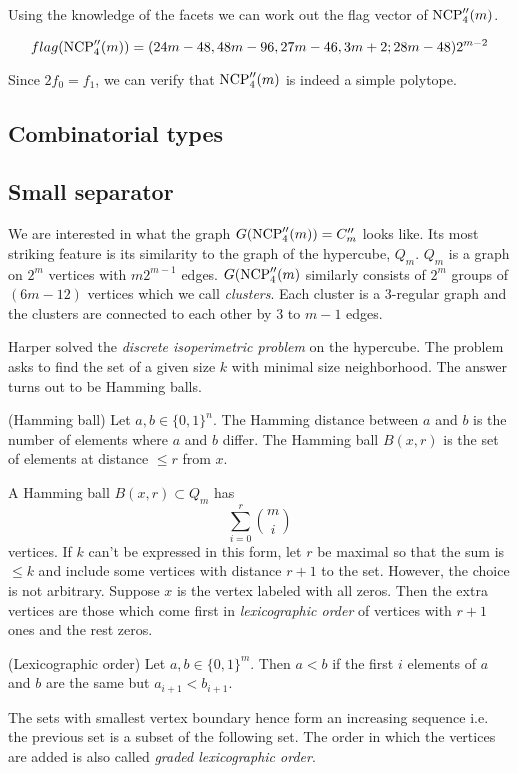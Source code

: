Using the knowledge of the facets we can work out the flag vector of 
$\textrm{NCP}''_4(m)$.

\begin{equation}
 flag(\textrm{NCP}''_4(m)) = (24m-48, 48m-96, 27m - 46, 3m+2; 28m -48)2^{m-2}
\end{equation}

Since $2f_0 = f_1$, we can verify that $\textrm{NCP}''_4(m)$ is indeed a simple 
polytope.

\subsection{Combinatorial types}

\subsection{Small separator}

We are interested in what the graph $G(\textrm{NCP}''_4(m)) = C''_m$ looks like. Its 
most striking feature is its similarity to the graph of the hypercube, $Q_m$. 
$Q_m$ is a graph on $2^m$ vertices with $m2^{m-1}$ edges. $G(\textrm{NCP}''_4(m)$ 
similarly consists of $2^m$ groups of $(6m-12)$ vertices which we call 
\textit{clusters}. Each cluster is a 3-regular graph and the clusters are 
connected to each other by 3 to $m-1$ edges. 

Harper solved the \textit{discrete isoperimetric problem} on the hypercube. The 
problem asks to find the set of a given size $k$ with minimal size 
neighborhood. The answer turns out to be Hamming balls.

\begin{definition}
 (Hamming ball) Let $a,b \in \{0,1\}^n$. The Hamming distance between $a$ and 
$b$ is the number of elements where $a$ and $b$ differ. The Hamming ball 
$B(x,r)$ is the set of elements at distance $\leq r$ from $x$.
\end{definition}

A Hamming ball $B(x,r) \subset Q_m$ has 
\begin{equation}
 \sum_{i=0}^r {m \choose i}
\end{equation}
vertices. If $k$ can't be expressed in this form, let $r$ be maximal so that 
the sum is $\leq k$ and include some vertices with distance $r+1$ to the set. 
However, the choice is not arbitrary. Suppose $x$ is the vertex labeled with 
all zeros. Then the extra vertices are those which come first in 
\textit{lexicographic order} of vertices with $r+1$ ones and the rest zeros.
\begin{definition}
 (Lexicographic order) Let $a,b \in \{0,1\}^m$. Then $a<b$ if the first $i$ 
elements of $a$ and $b$ are the same but $a_{i+1} < b_{i+1}$.
\end{definition}
The sets with smallest vertex boundary hence form an increasing sequence i.e. 
the previous set is a subset of the following set. The order in which the 
vertices are added is also called \textit{graded lexicographic order}.

